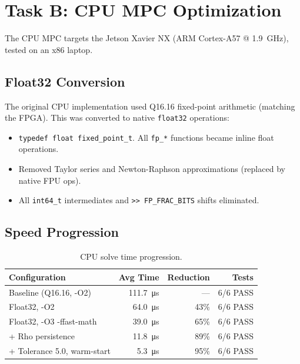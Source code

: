 \documentclass[11pt,a4paper]{article}
\begin{document}
\section{Task B: CPU MPC Optimization}

The CPU MPC targets the Jetson Xavier NX (ARM Cortex-A57 @ \SI{1.9}{\giga\hertz}), tested on an x86 laptop.

\subsection{Float32 Conversion}
\label{sec:float32}
The original CPU implementation used Q16.16 fixed-point arithmetic (matching the FPGA). This was converted to native \texttt{float32} operations:

\begin{itemize}
  \item \texttt{typedef float fixed\_point\_t}. All \texttt{fp\_*} functions became inline float operations.
  \item Removed Taylor series and Newton-Raphson approximations (replaced by native FPU ops).
  \item All \texttt{int64\_t} intermediates and \texttt{>> FP\_FRAC\_BITS} shifts eliminated.
\end{itemize}

\subsection{Speed Progression}

\begin{table}[H]
\centering
\caption{CPU solve time progression.}
\label{tab:cpu_speed}
\begin{tabular}{@{}lrrr@{}}
\toprule
\textbf{Configuration} & \textbf{Avg Time} & \textbf{Reduction} & \textbf{Tests} \\
\midrule
Baseline (Q16.16, -O2)      & \SI{111.7}{\micro\second} & ---    & 6/6 PASS \\
Float32, -O2                 & \SI{64.0}{\micro\second}  & 43\%  & 6/6 PASS \\
Float32, -O3 -ffast-math     & \SI{39.0}{\micro\second}  & 65\%  & 6/6 PASS \\
+ Rho persistence            & \SI{11.8}{\micro\second}  & 89\%  & 6/6 PASS \\
+ Tolerance 5.0, warm-start  & \SI{5.3}{\micro\second}   & 95\%  & 6/6 PASS \\
\bottomrule
\end{tabular}
\end{table}
\end{document}
